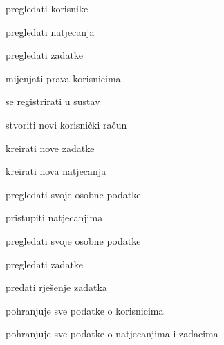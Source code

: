 			
			\begin{packed_enum}
				\item  {}
				
				\begin{packed_enum}
					
					\item pregledati korisnike
					\item pregledati natjecanja
					\item pregledati zadatke
					\item mijenjati prava korisnicima
					
				\end{packed_enum}
			
				\item  {}
				
				\begin{packed_enum}
					
					\item se registrirati u sustav
					\item stvoriti novi korisnički račun
					
				\end{packed_enum}

				\item  {}
				
				\begin{packed_enum}
					
					\item kreirati nove zadatke
					\item kreirati nova natjecanja
					\item pregledati svoje osobne podatke
					
				\end{packed_enum}

				\item  {}
				
				\begin{packed_enum}
					
					\item pristupiti natjecanjima
					\item pregledati svoje osobne podatke
					\item pregledati zadatke
					\item predati rješenje zadatka
					
				\end{packed_enum}

				\item  {}
				
				\begin{packed_enum}
					
					\item pohranjuje sve podatke o korisnicima
					\item pohranjuje sve podatke o natjecanjima i zadacima
					
				\end{packed_enum}
			\end{packed_enum}


